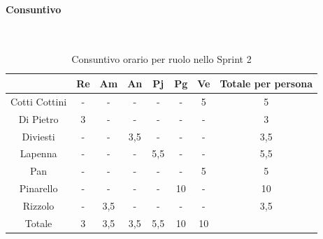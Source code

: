 \documentclass{article}
\begin{document}
                \paragraph{Consuntivo}\mbox{}\\
                \begin{table}[H]
                    \centering
                    \begin{tabular}{|c|c|c|c|c|c|c|c|}
                    \hline
                                    & Re  & Am  & An  & Pj  & Pg  & Ve  & Totale per persona \\ \hline
                    Cotti Cottini & -   & -   & -   & -   & -   & 5   & 5                  \\ \hline
                    Di Pietro     & 3   & -   & -   & -   & -   & -   & 3                  \\ \hline
                    Diviesti      & -   & -   & 3,5 & -   & -   & -   & 3,5                \\ \hline
                    Lapenna       & -   & -   & -   & 5,5 & -   & -   & 5,5                \\ \hline
                    Pan           & -   & -   & -   & -   & -   & 5   & 5                  \\ \hline
                    Pinarello     & -   & -   & -   & -   & 10  & -   & 10                 \\ \hline
                    Rizzolo       & -   & 3,5 & -   & -   & -   & -   & 3,5                \\ \hline
                    Totale        & 3   & 3,5 & 3,5 & 5,5 & 10  & 10  &                    \\ \hline
                    \end{tabular}
                    \caption{Consuntivo orario per ruolo nello Sprint 2}
                \end{table}

\end{document}

